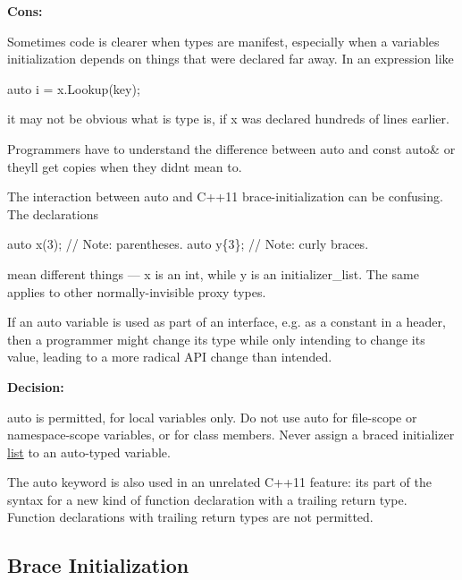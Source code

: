 {\bfseries Cons\+:}

Sometimes code is clearer when types are manifest, especially when a variable\textquotesingle{}s initialization depends on things that were declared far away. In an expression like


\begin{DoxyCode}
\textcolor{keyword}{auto} i = x.Lookup(key);
\end{DoxyCode}


it may not be obvious what i\textquotesingle{}s type is, if x was declared hundreds of lines earlier.

Programmers have to understand the difference between {\ttfamily auto} and {\ttfamily const auto\&} or they\textquotesingle{}ll get copies when they didn\textquotesingle{}t mean to.

The interaction between auto and C++11 brace-\/initialization can be confusing. The declarations


\begin{DoxyCode}
\textcolor{keyword}{auto} x(3);  \textcolor{comment}{// Note: parentheses.}
\textcolor{keyword}{auto} y\{3\};  \textcolor{comment}{// Note: curly braces.}
\end{DoxyCode}


mean different things — x is an int, while y is an initializer\+\_\+list. The same applies to other normally-\/invisible proxy types.

If an {\ttfamily auto} variable is used as part of an interface, e.\+g. as a constant in a header, then a programmer might change its type while only intending to change its value, leading to a more radical A\+PI change than intended.

{\bfseries Decision\+:}

{\ttfamily auto} is permitted, for local variables only. Do not use {\ttfamily auto} for file-\/scope or namespace-\/scope variables, or for class members. Never assign a braced initializer \hyperlink{protocollist-p}{list} to an auto-\/typed variable.

The {\ttfamily auto} keyword is also used in an unrelated C++11 feature\+: it\textquotesingle{}s part of the syntax for a new kind of function declaration with a trailing return type. Function declarations with trailing return types are not permitted.

\subsection*{Brace Initialization}

